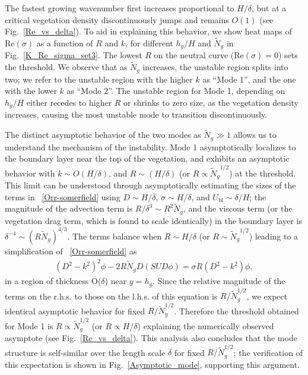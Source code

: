 \documentclass[aps,prl,twocolumn,superscriptaddress,sort&compress,10pt]{revtex4-1}  %
\newcommand{\hg}{h_g}
\newcommand{\Rey}{{R}}
\newcommand{\Ndg}{\tilde{N}_g}
\newcommand{\ubl}{U_\text{bl}}
\begin{document}
The fastest growing wavenumber first increases proportional to $H/\delta$, but at a critical vegetation density discontinuously jumps and remains $O(1)$ (see Fig.~\ref{Re_vs_delta}). 
To aid in explaining this behavior, we show heat maps of Re$(\sigma)$ as a function of $\Rey$ and $k$, for different $\hg/H$ and $\Ndg$ in Fig.~\ref{K_Re_sigma_set3}. 
The lowest $\Rey$ on the neutral curve (Re$(\sigma)=0$) sets the threshold. 
We observe that as $\Ndg$ increases, the unstable region splits into two; we refer to the unstable region with the higher $k$ as ``Mode 1'', and the one with the lower $k$ as ``Mode 2''. 
The unstable region for Mode 1, depending on $\hg/H$ either recedes to higher $\Rey$ or shrinks to zero size, as the vegetation density increases, causing the most unstable mode to transition discontinuously.

The distinct asymptotic behavior of the two modes as $\Ndg \gg 1$ allows us to understand the mechanism of the instability. 
Mode 1 asymptotically localizes to the boundary layer near the top of the vegetation, and exhibits an asymptotic behavior with $k \sim O(H/\delta)$, and $\Rey \sim (H/\delta)$ (or $\Rey \propto {\Ndg}^{1/2}$) at the threshold. 
This limit can be understood through asymptotically estimating the sizes of the terms in ~\eqref{Orr-somerfield} using $D\sim H/\delta$, $\sigma \sim H/\delta$, and $\ubl \sim \delta/H$; the magnitude of the advection term is $\Rey/\delta^3 \sim \Rey^2 \Ndg $, and the viscous term (or the vegetation drag term, which is found to scale identically) in the boundary layer is $\delta^{-4} \sim (\Rey \Ndg)^{4/3}$. 
The terms balance when $\Rey \sim H/\delta$ (or $\Rey \sim {\Ndg}^{1/2}$) leading to a simplification of ~\eqref{Orr-somerfield} as
\begin{align}
(D^2-k^2)^2 \phi- 2 \Rey \Ndg D( SUD\phi) = \sigma \Rey (D^2-k^2)\phi,
\label{eqn:mode1asymp}
\end{align} 
in a region of thickness O($\delta$) near $y=\hg$.
Since the relative magnitude of the terms on the r.h.s. to those on the l.h.s. of this equation is $\Rey/\Ndg^{1/2}$, we expect identical asymptotic behavior for fixed $\Rey/\Ndg^{1/2}$. 
Therefore the threshold obtained for Mode 1 is $\Rey \propto \Ndg^{1/2}$ (or $\Rey \propto H/\delta$) explaining the numerically observed asymptote (see Fig.~\ref{Re_vs_delta}). 
This analysis also concludes that the mode structure is self-similar over the length scale $\delta$ for fixed $\Rey/\Ndg^{1/2}$; the verification of this expectation is shown in Fig.~\ref{Asymptotic_mode}, supporting this argument.
\end{document}
